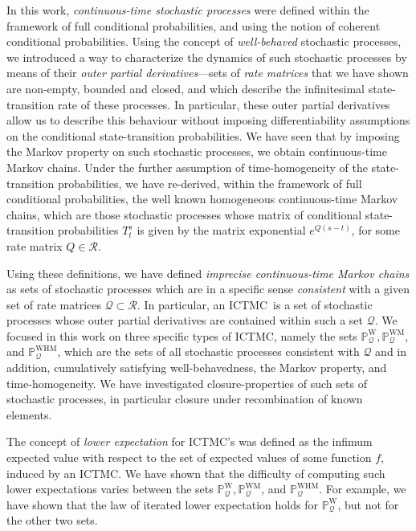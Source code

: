 \documentclass[10pt,a4paper]{paper}
\theoremstyle{definition}
\newcommand{\processes}{\mathbb{P}}
\newcommand{\wprocesses}{\processes^{\mathrm{W}}}
\newcommand{\wmprocesses}{\processes^{\mathrm{WM}}}
\newcommand{\whmprocesses}{\processes^{\mathrm{WHM}}}
\newcommand{\rateset}{\mathcal{Q}}
\newcommand{\ictmc}{{ICTMC}}
\begin{document}
In this work, \emph{continuous-time stochastic processes} were defined within the framework of full conditional probabilities, and using the notion of coherent conditional probabilities. Using the concept of \emph{well-behaved} stochastic processes, we introduced a way to characterize the dynamics of such stochastic processes by means of their \emph{outer partial derivatives}---sets of \emph{rate matrices} that we have shown are non-empty, bounded and closed, and which describe the infinitesimal state-transition rate of these processes. In particular, these outer partial derivatives allow us to describe this behaviour without imposing differentiability assumptions on the conditional state-transition probabilities. We have seen that by imposing the Markov property on such stochastic processes, we obtain continuous-time Markov chains. Under the further assumption of time-homogeneity of the state-transition probabilities, we have re-derived, within the framework of full conditional probabilities, the well known homogeneous continuous-time Markov chains, which are those stochastic processes whose matrix of conditional state-transition probabilities $T_t^s$ is given by the matrix exponential $e^{Q(s-t)}$, for some rate matrix $Q\in\mathcal{R}$.

Using these definitions, we have defined \emph{imprecise continuous-time Markov chains} as sets of stochastic processes which are in a specific sense \emph{consistent} with a given set of rate matrices $\rateset\subset\mathcal{R}$. In particular, an \ictmc~is a set of stochastic processes whose outer partial derivatives are contained within such a set $\rateset$. We focused in this work on three specific types of \ictmc, namely the sets $\wprocesses_{\rateset}, \wmprocesses_{\rateset}$, and $\whmprocesses_{\rateset}$, which are the sets of all stochastic processes consistent with $\rateset$ and in addition, cumulatively satisfying well-behavedness, the Markov property, and time-homogeneity. We have investigated closure-properties of such sets of stochastic processes, in particular closure under recombination of known elements.

The concept of \emph{lower expectation} for \ictmc's was defined as the infimum expected value with respect to the set of expected values of some function $f$, induced by an \ictmc. We have shown that the difficulty of computing such lower expectations varies between the sets $\wprocesses_{\rateset}, \wmprocesses_{\rateset}$, and $\whmprocesses_{\rateset}$. For example, we have shown that the law of iterated lower expectation holds for $\wprocesses_{\rateset}$, but not for the other two sets.
\end{document}
